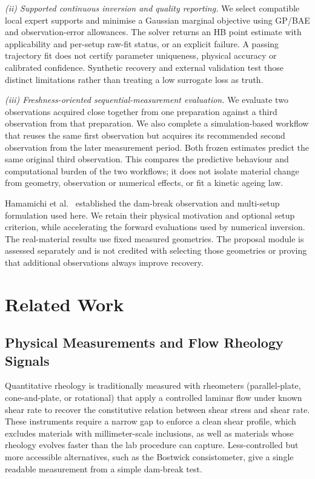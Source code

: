 \emph{(ii) Supported continuous inversion and quality reporting.}
We select compatible local expert supports and minimise a Gaussian
marginal objective using GP/BAE and observation-error allowances.
The solver returns an HB point estimate with applicability and per-setup
raw-fit status, or an explicit failure. A passing trajectory fit does
not certify parameter uniqueness, physical accuracy or calibrated
confidence. Synthetic recovery and external validation test those
distinct limitations rather than treating a low surrogate loss as truth.

\emph{(iii) Freshness-oriented sequential-measurement evaluation.}
We evaluate two observations acquired close together from one preparation
against a third observation from that preparation. We also complete a
simulation-based workflow that reuses the same first observation but
acquires its recommended second observation from the later measurement period.
Both frozen estimates predict the same original third observation.
This compares the predictive behaviour and computational burden of the
two workflows; it does not isolate material change from geometry,
observation or numerical effects, or fit a kinetic ageing law.

Hamamichi et al.~\cite{hamamichi2023nonnewtonian} established
the dam-break observation and multi-setup formulation used here.
We retain their physical motivation and optional setup criterion,
while accelerating the forward evaluations used by numerical inversion.
The real-material results use fixed measured geometries. The proposal
module is assessed separately and is not credited with selecting those
geometries or proving that additional observations always improve recovery.

\section{Related Work}

\subsection{Physical Measurements and Flow Rheology Signals}

Quantitative rheology is traditionally measured with rheometers
(parallel-plate, cone-and-plate, or rotational) that apply a
controlled laminar flow under known shear rate to recover the
constitutive relation between shear stress and shear rate. These
instruments require a narrow gap to enforce a clean shear profile,
which excludes materials with millimeter-scale inclusions, as well
as materials whose rheology evolves faster than the lab procedure
can capture. Less-controlled but more accessible alternatives, such
as the Bostwick consistometer, give a single readable measurement
from a simple dam-break test.

